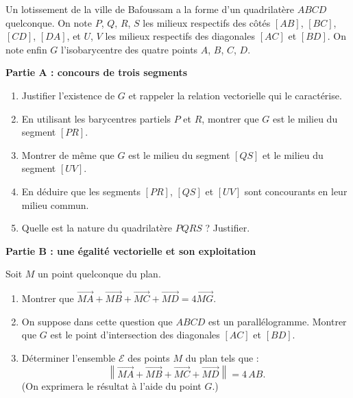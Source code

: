 \documentclass[11pt]{article}
\begin{document}
\begin{exercice}
Un lotissement de la ville de Bafoussam a la forme d'un quadrilatère $ABCD$ quelconque. On note $P$, $Q$, $R$, $S$ les milieux respectifs des côtés $[AB]$, $[BC]$, $[CD]$, $[DA]$, et $U$, $V$ les milieux respectifs des diagonales $[AC]$ et $[BD]$. On note enfin $G$ l'isobarycentre des quatre points $A$, $B$, $C$, $D$.

\textbf{Partie A : concours de trois segments}
\begin{enumerate}
\item Justifier l'existence de $G$ et rappeler la relation vectorielle qui le caractérise.
\item En utilisant les barycentres partiels $P$ et $R$, montrer que $G$ est le milieu du segment $[PR]$.
\item Montrer de même que $G$ est le milieu du segment $[QS]$ et le milieu du segment $[UV]$.
\item En déduire que les segments $[PR]$, $[QS]$ et $[UV]$ sont concourants en leur milieu commun.
\item Quelle est la nature du quadrilatère $PQRS$ ? Justifier.
\end{enumerate}

\textbf{Partie B : une égalité vectorielle et son exploitation}

Soit $M$ un point quelconque du plan.
\begin{enumerate}
\item Montrer que $\overrightarrow{MA} + \overrightarrow{MB} + \overrightarrow{MC} + \overrightarrow{MD} = 4\overrightarrow{MG}$.
\item On suppose dans cette question que $ABCD$ est un parallélogramme. Montrer que $G$ est le point d'intersection des diagonales $[AC]$ et $[BD]$.
\item Déterminer l'ensemble $\mathcal{E}$ des points $M$ du plan tels que :
\[ \left\| \overrightarrow{MA} + \overrightarrow{MB} + \overrightarrow{MC} + \overrightarrow{MD} \right\| = 4\,AB. \]
(On exprimera le résultat à l'aide du point $G$.)
\end{enumerate}
\end{exercice}
\end{document}
